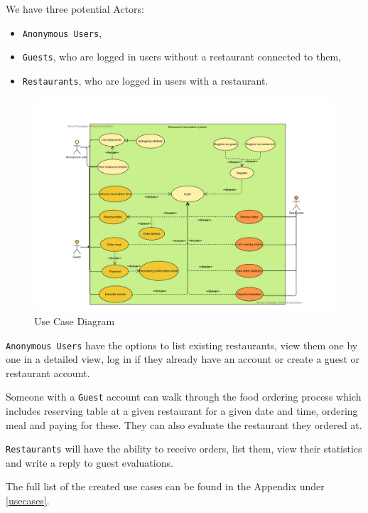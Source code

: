 We have three potential Actors: 

\begin{itemize}
	\item \verb+Anonymous Users+,
	\item \verb+Guests+, who are logged in users without a restaurant connected to them,
	\item \verb+Restaurants+, who are logged in users with a restaurant.
\end{itemize}

 \begin{figure}[!ht]
	\centering
	\includegraphics[width=150mm, keepaspectratio]{figures/UseCaseDiagram}
	\caption{Use Case Diagram} 
	\label{fig:UseCaseDiagram}
\end{figure}

\verb+Anonymous Users+ have the options to list existing restaurants, view them one by one in a detailed view, log in if they already have an account or create a guest or restaurant account. 

Someone with a \verb+Guest+ account can walk through the food ordering process which includes reserving table at a given restaurant for a given date and time, ordering meal and paying for these. They can also evaluate the restaurant they ordered at.

\verb+Restaurants+ will have the ability to receive orders, list them, view their statistics and write a reply to guest evaluations.

The full list of the created use cases can be found in the Appendix under \ref{usecases}.

